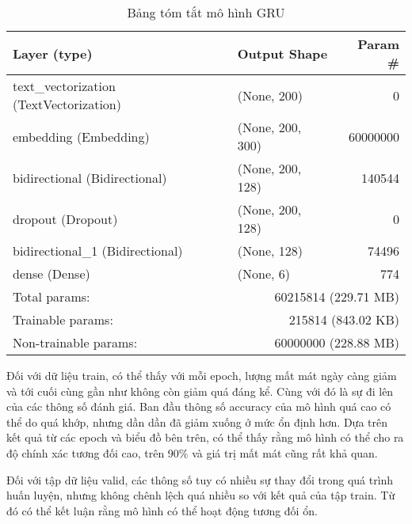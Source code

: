 \begin{table}[htb]
    \centering
    \caption{Bảng tóm tắt mô hình GRU}\label{table:gru-model}
    \begin{tabular}{l l r}
        \toprule
        \textbf{Layer (type)}                   & \textbf{Output Shape}                    & \textbf{Param \#} \\\midrule
        text\_vectorization (TextVectorization) & (None, 200)                              & 0                 \\
        embedding (Embedding)                   & (None, 200, 300)                         & 60000000          \\
        bidirectional (Bidirectional)           & (None, 200, 128)                         & 140544            \\
        dropout (Dropout)                       & (None, 200, 128)                         & 0                 \\
        bidirectional\_1 (Bidirectional)        & (None, 128)                              & 74496             \\
        dense (Dense)                           & (None, 6)                                & 774               \\\midrule
        Total params:                           & \multicolumn{2}{r}{60215814 (229.71 MB)}                     \\
        Trainable params:                       & \multicolumn{2}{r}{215814 (843.02 KB)}                       \\
        Non-trainable params:                   & \multicolumn{2}{r}{60000000 (228.88 MB)}                     \\
        \bottomrule
    \end{tabular}
\end{table}

Đối với dữ liệu train, có thể thấy với mỗi epoch, lượng mất mát ngày càng giảm và tới cuối cùng gần như không còn giảm quá đáng kể. Cùng với đó là sự đi lên của các thông số đánh giá. Ban đầu thông số accuracy của mô hình quá cao có thể do quá khớp, nhưng dần dần đã giảm xuống ở mức ổn định hơn. Dựa trên kết quả từ các epoch và biểu đồ bên trên, có thể thấy rằng mô hình có thể cho ra độ chính xác tương đối cao, trên 90\% và giá trị mất mát cũng rất khả quan.

Đối với tập dữ liệu valid, các thông số tuy có nhiều sự thay đổi trong quá trình huấn luyện, nhưng không chênh lệch quá nhiều so với kết quả của tập train. Từ đó có thể kết luận rằng mô hình có thể hoạt động tương đối ổn.

